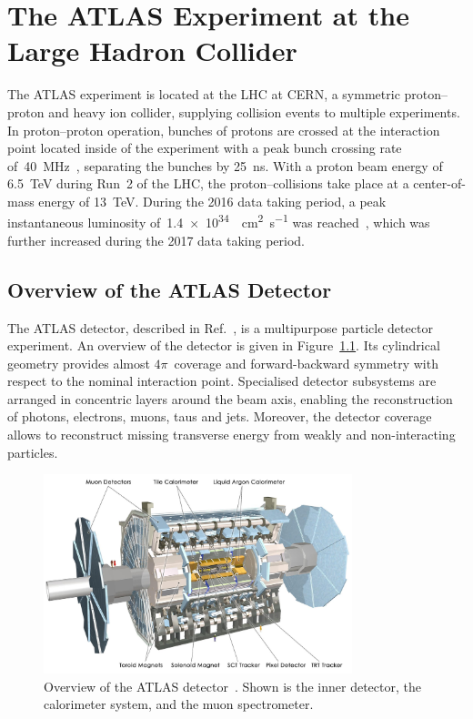 \chapter{The ATLAS Experiment at the Large Hadron Collider}
\label{chap:atlas}

The ATLAS experiment is located at the LHC at CERN, a symmetric proton--proton
and heavy ion collider, supplying collision events to multiple experiments. In
proton--proton operation, bunches of protons are crossed at the interaction
point located inside of the experiment with a peak bunch crossing rate
of~\SI{40}{\mega\hertz}~\cite{lhc}, separating the bunches by
\SI{25}{\nano\second}. With a proton beam energy of \SI{6.5}{\TeV} during Run~2
of the LHC, the proton--collisions take place at a center-of-mass energy of
\SI{13}{\TeV}. During the 2016 data taking period, a peak instantaneous
luminosity of~\SI{1.4e34}{\per\square\centi\metre\per\second} was
reached~\cite{lhc_2016_report}, which was further increased during the 2017 data
taking period.

\section{Overview of the ATLAS Detector}
\label{sec:atlas}

The ATLAS detector, described in Ref.\ \cite{atlas_detector}, is a multipurpose
particle detector experiment. An overview of the detector is given in
Figure~\ref{fig:atlas_detector}. Its cylindrical geometry provides almost
$4\pi$~coverage and forward-backward symmetry with respect to the nominal
interaction point. Specialised detector subsystems are arranged in concentric
layers around the beam axis, enabling the reconstruction of photons, electrons,
muons, taus and jets. Moreover, the detector coverage allows to reconstruct
missing transverse energy from weakly and non-interacting particles.

\begin{figure}[htb]
  \centering
  \includegraphics[width=0.8\textwidth]{./figures/atlas/overview.jpg}
  \caption[Overview of the ATLAS detector]{Overview of the ATLAS
    detector~\cite{atlas_detector}. Shown is the inner detector, the calorimeter
    system, and the muon spectrometer.}
  \label{fig:atlas_detector}
\end{figure}

